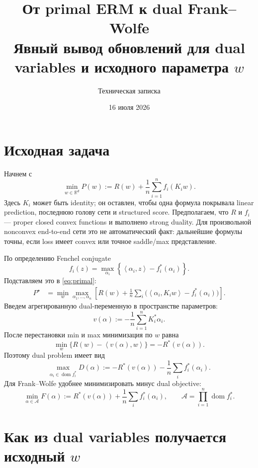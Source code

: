 \documentclass[11pt,a4paper]{article}
\title{\bfseries От primal ERM к dual Frank--Wolfe\\
\large Явный вывод обновлений для dual variables и исходного параметра \(w\)}
\author{Техническая записка}
\date{16 июля 2026}
\newcommand{\R}{\mathbb{R}}
\newcommand{\A}{\mathcal{A}}
\newcommand{\ip}[2]{\left\langle #1,#2\right\rangle}
\newcommand{\dom}{\operatorname{dom}}
\begin{document}
\maketitle

\section{Исходная задача}

Начнем с
\begin{equation}
  \label{eq:primal}
  \boxed{
  \min_{w\in\R^d}P(w)
  :=R(w)+\frac1n\sum_{i=1}^n f_i(K_iw).}
\end{equation}
Здесь \(K_i\) может быть identity; он оставлен, чтобы одна формула покрывала linear prediction, последнюю голову сети и structured score. Предполагаем, что \(R\) и \(f_i\) --- proper closed convex functions и выполнено strong duality. Для произвольной nonconvex end-to-end сети это не автоматический факт: дальнейшие формулы точны, если loss имеет convex или точное saddle/max представление.

По определению Fenchel conjugate
\[
  f_i(z)=\max_{\alpha_i}
  \left\{\ip{\alpha_i}{z}-f_i^*(\alpha_i)\right\}.
\]
Подставляем это в \eqref{eq:primal}:
\begin{align}
  P^\star
  &=\min_w\max_{\alpha_1,\ldots,\alpha_n}
  \left[
  R(w)+\frac1n\sum_i
  \bigl(\ip{\alpha_i}{K_iw}-f_i^*(\alpha_i)\bigr)
  \right].
  \label{eq:saddle}
\end{align}
Введем агрегированную dual-переменную в пространстве параметров:
\begin{equation}
  \label{eq:v}
  v(\alpha):=-\frac1n\sum_{i=1}^nK_i^*\alpha_i.
\end{equation}
После перестановки min и max минимизация по \(w\) равна
\[
  \min_w\{R(w)-\ip{v(\alpha)}{w}\}=-R^*(v(\alpha)).
\]
Поэтому dual problem имеет вид
\begin{equation}
  \label{eq:dual-max}
  \boxed{
  \max_{\alpha_i\in\dom f_i^*}
  D(\alpha):=-R^*(v(\alpha))-\frac1n\sum_i f_i^*(\alpha_i).}
\end{equation}
Для Frank--Wolfe удобнее минимизировать минус dual objective:
\begin{equation}
  \label{eq:dual-min}
  \boxed{
  \min_{\alpha\in\A}F(\alpha)
  :=R^*(v(\alpha))+\frac1n\sum_i f_i^*(\alpha_i),
  \qquad
  \A=\prod_{i=1}^n\dom f_i^*.}
\end{equation}

\section{Как из dual variables получается исходный \(w\)}
\end{document}
